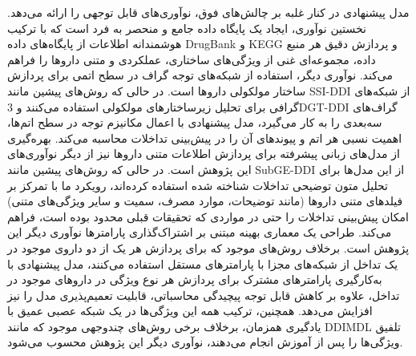 مدل پیشنهادی در کنار غلبه بر چالش‌های فوق، نوآوری‌های قابل توجهی را ارائه می‌دهد. نخستین نوآوری، ایجاد یک پایگاه داده جامع و منحصر به فرد است که با ترکیب هوشمندانه اطلاعات از پایگاه‌های داده DrugBank و KEGG و پردازش دقیق هر منبع داده، مجموعه‌ای غنی از ویژگی‌های ساختاری، عملکردی و متنی داروها را فراهم می‌کند. نوآوری دیگر، استفاده از شبکه‌های توجه گراف در سطح اتمی برای پردازش ساختار مولکولی داروها است. در حالی که روش‌های پیشین مانند SSI-DDI \cite{ref_nyamabo2021} از شبکه‌های گرافی برای تحلیل زیرساختارهای مولکولی استفاده می‌کنند و 3DGT-DDI \cite{ref_he2023} گراف‌های سه‌بعدی را به کار می‌گیرد، مدل پیشنهادی با اعمال مکانیزم توجه در سطح اتم‌ها، اهمیت نسبی هر اتم و پیوندهای آن را در پیش‌بینی تداخلات محاسبه می‌کند. بهره‌گیری از مدل‌های زبانی پیشرفته برای پردازش اطلاعات متنی داروها نیز از دیگر نوآوری‌های این پژوهش است. در حالی که روش‌های پیشین مانند SubGE-DDI \cite{ref_shi2024} از این مدل‌ها برای تحلیل متون توضیحی تداخلات شناخته شده استفاده کرده‌اند، رویکرد ما با تمرکز بر فیلدهای متنی داروها (مانند توضیحات، موارد مصرف، سمیت و سایر ویژگی‌های متنی) امکان پیش‌بینی تداخلات را حتی در مواردی که تحقیقات قبلی محدود بوده است، فراهم می‌کند. طراحی یک معماری بهینه مبتنی بر اشتراک‌گذاری پارامترها نوآوری دیگر این پژوهش است. برخلاف روش‌های موجود که برای پردازش هر یک از دو داروی موجود در یک تداخل از شبکه‌های مجزا با پارامترهای مستقل استفاده می‌کنند، مدل پیشنهادی با به‌کارگیری پارامترهای مشترک برای پردازش هر نوع ویژگی در داروهای موجود در تداخل، علاوه بر کاهش قابل توجه پیچیدگی محاسباتی، قابلیت تعمیم‌پذیری مدل را نیز افزایش می‌دهد.  همچنین، ترکیب همه این ویژگی‌ها در یک شبکه عصبی عمیق با یادگیری همزمان، برخلاف برخی روش‌های چندوجهی موجود که مانند DDIMDL \cite{ref_deng2020} تلفیق ویژگی‌ها را پس از آموزش انجام می‌دهند، نوآوری دیگر این پژوهش محسوب می‌شود.
